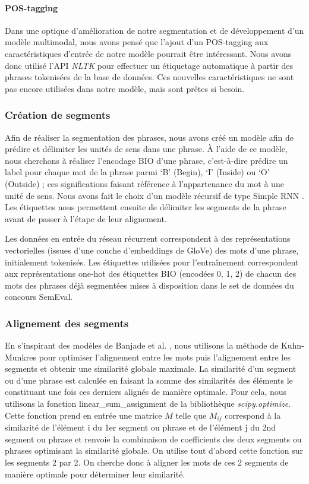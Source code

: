 \documentclass[a4paper, twoside, 11pt]{article}
\begin{document}
 \paragraph{POS-tagging}

Dans une optique d’amélioration de notre segmentation et de développement d'un modèle multimodal, nous avons pensé que l’ajout d’un \og POS-tagging \fg{} aux caractéristiques d’entrée de notre modèle pourrait être intéressant. Nous avons donc utilisé l’API \textit{NLTK} pour effectuer un étiquetage automatique à partir des phrases tokenisées de la base de données. Ces nouvelles caractéristiques ne sont pas encore utilisées dans notre modèle, mais sont prêtes si besoin.

    \subsubsection{Création de segments}
 Afin de réaliser la segmentation des phrases, nous avons créé un modèle afin de prédire et délimiter les unités de sens dans une phrase. À l’aide de ce modèle, nous cherchons à réaliser l'encodage BIO d’une phrase, c’est-à-dire prédire un label pour chaque mot de la phrase parmi ‘B’ (Begin), ‘I’ (Inside) ou ‘O’ (Outside) ; ces significations faisant référence à l’appartenance du mot à une unité de sens. Nous avons fait le choix d’un modèle récursif de type \og Simple RNN \fg{}. Les étiquettes nous permettent ensuite de délimiter les segments de la phrase avant de passer à l’étape de leur alignement.

Les données en entrée du réseau récurrent correspondent à des représentations vectorielles (issues d’une couche d’embeddings de GloVe) des mots d’une phrase, initialement tokenisés. Les étiquettes utilisées pour l'entraînement correspondent aux représentations \og one-hot  \fg{} des étiquettes BIO (encodées 0, 1, 2) de chacun des mots des phrases déjà segmentées mises à disposition dans le set de données du concours SemEval.

\subsubsection{Alignement des segments}

En s’inspirant des modèles de Banjade et al. \cite{banjade}  \cite{banjadeautre}, nous utilisons la méthode de Kuhn-Munkres pour optimiser l’alignement entre les mots puis l’alignement entre les segments et obtenir une similarité globale maximale. La similarité d’un segment ou d’une phrase est calculée en faisant la somme des similarités des éléments le constituant une fois ces derniers alignés de manière optimale. Pour cela, nous utilisons la fonction \og linear\_sum\_assignment \fg{} de la bibliothèque \textit{scipy.optimize}. Cette fonction prend en entrée une matrice $M$ telle que $M_{ij}$ correspond à la similarité de l’élément i du 1er segment ou phrase et de l’élément j du 2nd segment ou phrase et renvoie la combinaison de coefficients des deux segments ou phrases optimisant la similarité globale. On utilise tout d’abord cette fonction sur les segments 2 par 2. On cherche donc à aligner les mots de ces 2 segments de manière optimale pour déterminer leur similarité.
\end{document}
